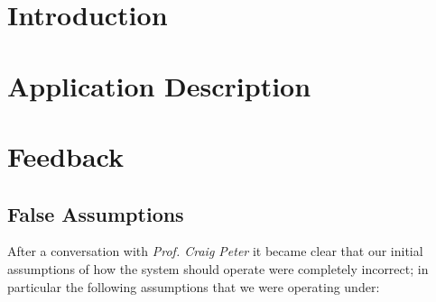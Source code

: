 \documentclass[
10pt, %
a4paper, %
oneside, %
headinclude,footinclude, %
BCOR5mm, %
]{scrartcl}
\begin{document}
\section{Introduction} %
\label{sec:introduction}




\section{Application Description} %
\label{sec:application_description}


\section{Feedback} %
\label{sec:feedback}

\subsection{False Assumptions} %
\label{sub:false_assumptions}

After a conversation with \textit{Prof. Craig Peter} it became clear that our initial assumptions of how the system should operate were completely incorrect; in particular the following assumptions that we were operating under:
\end{document}
